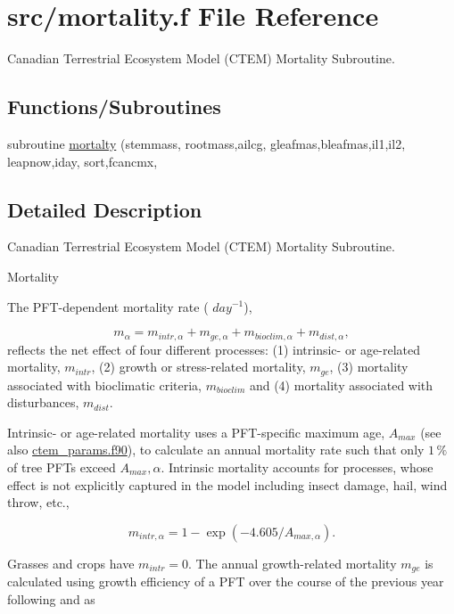 \hypertarget{mortality_8f}{}\section{src/mortality.f File Reference}
\label{mortality_8f}


Canadian Terrestrial Ecosystem Model (C\+T\+E\+M) Mortality Subroutine.  


\subsection*{Functions/\+Subroutines}
\begin{DoxyCompactItemize}
\item 
subroutine \hyperlink{mortality_8f_a11a826efba70183880f4f963e93c4247}{mortalty} (stemmass, rootmass,ailcg, gleafmas,bleafmas,il1,il2, leapnow,iday, sort,fcancmx,
\end{DoxyCompactItemize}


\subsection{Detailed Description}
Canadian Terrestrial Ecosystem Model (C\+T\+E\+M) Mortality Subroutine. 

Mortality

The P\+F\+T-\/dependent mortality rate ( $day^{-1}$),

\[ \label{mortality} m_{\alpha} = m_{intr,\alpha} + m_{ge,\alpha} + m_{bioclim,\alpha} + m_{dist,\alpha}, \] reflects the net effect of four different processes\+: (1) intrinsic-\/ or age-\/related mortality, $m_{intr}$, (2) growth or stress-\/related mortality, $m_{ge}$, (3) mortality associated with bioclimatic criteria, $m_{bioclim}$ and (4) mortality associated with disturbances, $m_{dist}$.

Intrinsic-\/ or age-\/related mortality uses a P\+F\+T-\/specific maximum age, $A_{max}$ (see also \hyperlink{ctem__params_8f90}{ctem\+\_\+params.\+f90}), to calculate an annual mortality rate such that only $1\,{\%}$ of tree P\+F\+Ts exceed $A_{max},\alpha$. Intrinsic mortality accounts for processes, whose effect is not explicitly captured in the model including insect damage, hail, wind throw, etc.,

\[ \label{intrmort} m_{intr,\alpha} = 1 - \exp(-4.605/A_{max,\alpha}). \]

Grasses and crops have $m_{intr} = 0$. The annual growth-\/related mortality $m_{ge}$ is calculated using growth efficiency of a P\+F\+T over the course of the previous year following \cite{Prentice1993-xn} and \cite{Sitch2003-847} as

